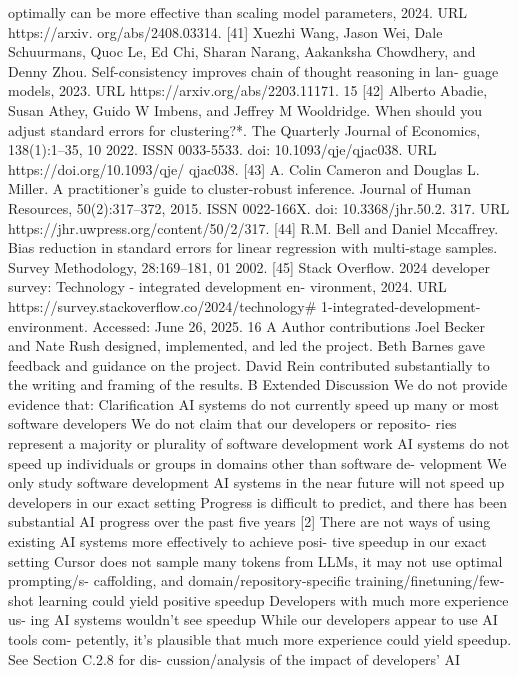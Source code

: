 optimally can be more effective than scaling model parameters, 2024. URL https://arxiv.
org/abs/2408.03314.
[41] Xuezhi Wang, Jason Wei, Dale Schuurmans, Quoc Le, Ed Chi, Sharan Narang, Aakanksha
Chowdhery, and Denny Zhou. Self-consistency improves chain of thought reasoning in lan-
guage models, 2023. URL https://arxiv.org/abs/2203.11171.
15
[42] Alberto Abadie, Susan Athey, Guido W Imbens, and Jeffrey M Wooldridge. When should you
adjust standard errors for clustering?*. The Quarterly Journal of Economics, 138(1):1–35, 10
2022. ISSN 0033-5533. doi: 10.1093/qje/qjac038. URL https://doi.org/10.1093/qje/
qjac038.
[43] A. Colin Cameron and Douglas L. Miller. A practitioner’s guide to cluster-robust inference.
Journal of Human Resources, 50(2):317–372, 2015. ISSN 0022-166X. doi: 10.3368/jhr.50.2.
317. URL https://jhr.uwpress.org/content/50/2/317.
[44] R.M. Bell and Daniel Mccaffrey. Bias reduction in standard errors for linear regression with
multi-stage samples. Survey Methodology, 28:169–181, 01 2002.
[45] Stack Overflow.
2024 developer survey:
Technology - integrated development en-
vironment,
2024.
URL https://survey.stackoverflow.co/2024/technology\#
1-integrated-development-environment. Accessed: June 26, 2025.
16
A
Author contributions
Joel Becker and Nate Rush designed, implemented, and led the project.
Beth Barnes gave feedback and guidance on the project.
David Rein contributed substantially to the writing and framing of the results.
B
Extended Discussion
We do not provide evidence that:
Clarification
AI systems do not currently speed up many
or most software developers
We do not claim that our developers or reposito-
ries represent a majority or plurality of software
development work
AI systems do not speed up individuals or
groups in domains other than software de-
velopment
We only study software development
AI systems in the near future will not speed
up developers in our exact setting
Progress is difficult to predict, and there has been
substantial AI progress over the past five years [2]
There are not ways of using existing AI
systems more effectively to achieve posi-
tive speedup in our exact setting
Cursor does not sample many tokens from
LLMs, it may not use optimal prompting/s-
caffolding,
and
domain/repository-specific
training/finetuning/few-shot learning could yield
positive speedup
Developers with much more experience us-
ing AI systems wouldn’t see speedup
While our developers appear to use AI tools com-
petently, it’s plausible that much more experience
could yield speedup. See Section C.2.8 for dis-
cussion/analysis of the impact of developers’ AI
